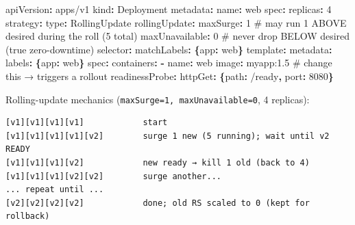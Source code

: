 \documentclass[11pt]{article}
\newenvironment{Shaded}{\begin{snugshade}}{\end{snugshade}}
\newcommand{\AttributeTok}[1]{\textcolor[rgb]{0.16,0.50,0.73}{#1}}
\newcommand{\CommentTok}[1]{\textcolor[rgb]{0.48,0.49,0.49}{#1}}
\newcommand{\DecValTok}[1]{\textcolor[rgb]{0.96,0.45,0.00}{#1}}
\newcommand{\FunctionTok}[1]{\textcolor[rgb]{0.56,0.27,0.68}{#1}}
\newcommand{\KeywordTok}[1]{\textcolor[rgb]{0.81,0.81,0.76}{\textbf{#1}}}
\begin{document}
\begin{Shaded}
\begin{Highlighting}[]
\FunctionTok{apiVersion}\KeywordTok{:}\AttributeTok{ apps/v1}
\FunctionTok{kind}\KeywordTok{:}\AttributeTok{ Deployment}
\FunctionTok{metadata}\KeywordTok{:}
\AttributeTok{  }\FunctionTok{name}\KeywordTok{:}\AttributeTok{ web}
\FunctionTok{spec}\KeywordTok{:}
\AttributeTok{  }\FunctionTok{replicas}\KeywordTok{:}\AttributeTok{ }\DecValTok{4}
\AttributeTok{  }\FunctionTok{strategy}\KeywordTok{:}
\AttributeTok{    }\FunctionTok{type}\KeywordTok{:}\AttributeTok{ RollingUpdate}
\AttributeTok{    }\FunctionTok{rollingUpdate}\KeywordTok{:}
\AttributeTok{      }\FunctionTok{maxSurge}\KeywordTok{:}\AttributeTok{ }\DecValTok{1}\CommentTok{          \# may run 1 ABOVE desired during the roll (5 total)}
\AttributeTok{      }\FunctionTok{maxUnavailable}\KeywordTok{:}\AttributeTok{ }\DecValTok{0}\CommentTok{    \# never drop BELOW desired (true zero{-}downtime)}
\AttributeTok{  }\FunctionTok{selector}\KeywordTok{:}
\AttributeTok{    }\FunctionTok{matchLabels}\KeywordTok{:}\AttributeTok{ }\KeywordTok{\{}\FunctionTok{app}\KeywordTok{:}\AttributeTok{ web}\KeywordTok{\}}
\AttributeTok{  }\FunctionTok{template}\KeywordTok{:}
\AttributeTok{    }\FunctionTok{metadata}\KeywordTok{:}
\AttributeTok{      }\FunctionTok{labels}\KeywordTok{:}\AttributeTok{ }\KeywordTok{\{}\FunctionTok{app}\KeywordTok{:}\AttributeTok{ web}\KeywordTok{\}}
\AttributeTok{    }\FunctionTok{spec}\KeywordTok{:}
\AttributeTok{      }\FunctionTok{containers}\KeywordTok{:}
\AttributeTok{        }\KeywordTok{{-}}\AttributeTok{ }\FunctionTok{name}\KeywordTok{:}\AttributeTok{ web}
\AttributeTok{          }\FunctionTok{image}\KeywordTok{:}\AttributeTok{ myapp:1.5}\CommentTok{     \# change this → triggers a rollout}
\AttributeTok{          }\FunctionTok{readinessProbe}\KeywordTok{:}
\AttributeTok{            }\FunctionTok{httpGet}\KeywordTok{:}\AttributeTok{ }\KeywordTok{\{}\FunctionTok{path}\KeywordTok{:}\AttributeTok{ /ready}\KeywordTok{,}\AttributeTok{ }\FunctionTok{port}\KeywordTok{:}\AttributeTok{ }\DecValTok{8080}\KeywordTok{\}}
\end{Highlighting}
\end{Shaded}

Rolling-update mechanics (\texttt{maxSurge=1,\ maxUnavailable=0}, 4 replicas):

\setcodelang{}

\begin{verbatim}
[v1][v1][v1][v1]            start
[v1][v1][v1][v1][v2]        surge 1 new (5 running); wait until v2 READY
[v1][v1][v1][v2]            new ready → kill 1 old (back to 4)
[v1][v1][v1][v2][v2]        surge another...
... repeat until ...
[v2][v2][v2][v2]            done; old RS scaled to 0 (kept for rollback)
\end{verbatim}
\end{document}

